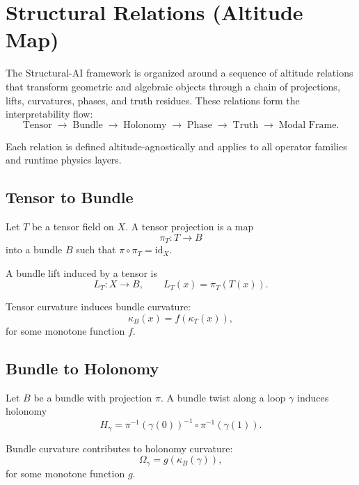 \section{Structural Relations (Altitude Map)}

The Structural-AI framework is organized around a sequence of altitude relations
that transform geometric and algebraic objects through a chain of projections,
lifts, curvatures, phases, and truth residues. These relations form the
interpretability flow:
\[
\text{Tensor} \;\to\; \text{Bundle} \;\to\; \text{Holonomy} \;\to\; 
\text{Phase} \;\to\; \text{Truth} \;\to\; \text{Modal Frame}.
\]

Each relation is defined altitude-agnostically and applies to all operator
families and runtime physics layers.

\subsection{Tensor to Bundle}

\begin{definition}
Let $T$ be a tensor field on $X$. A tensor projection is a map
\[
\pi_T : T \to B
\]
into a bundle $B$ such that $\pi \circ \pi_T = \mathrm{id}_X$.
\end{definition}

\begin{definition}
A bundle lift induced by a tensor is
\[
L_T : X \to B, \qquad L_T(x) = \pi_T(T(x)).
\]
\end{definition}

\begin{axiom}
Tensor curvature induces bundle curvature:
\[
\kappa_B(x) = f(\kappa_T(x)),
\]
for some monotone function $f$.
\end{axiom}

\subsection{Bundle to Holonomy}

\begin{definition}
Let $B$ be a bundle with projection $\pi$. A bundle twist along a loop $\gamma$
induces holonomy
\[
H_\gamma = \pi^{-1}(\gamma(0))^{-1} \circ \pi^{-1}(\gamma(1)).
\]
\end{definition}

\begin{axiom}
Bundle curvature contributes to holonomy curvature:
\[
\Omega_\gamma = g(\kappa_B(\gamma)),
\]
for some monotone function $g$.
\end{axiom}

